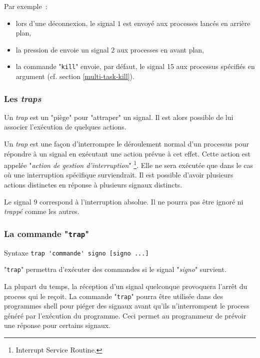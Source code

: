 Par exemple~:
\begin{itemize}
	\item	lors d'une d{\'e}connexion, le signal $1$ est envoy{\'e} aux processes lanc{\'e}s en
			arri{\`e}re plan,
	\item	la pression de  envoie un signal $2$ aux
			processes en avant plan,
	\item	la commande "\texttt{kill}" envoie, par d{\'e}faut, le signal 15 aux processus
			sp{\'e}cifi{\'e}s en argument (cf. section \ref{multi-task-kill}).
\end{itemize}

\subsubsection{Les \textsl{traps}}

Un \textsl{trap} est un "pi{\`e}ge" pour "attraper" un signal. Il est alors possible de lui
associer l'ex{\'e}cution de quelques actions.

Un \textsl{trap} est une fa\c{c}on d'interrompre le d{\'e}roulement normal d'un
processus pour r{\'e}pondre {\`a} un signal en ex{\'e}cutant une action pr{\'e}vue {\`a} cet
effet. Cette action est appel{\'e}e "\textsl{action de gestion d'interruption}"
\footnote{Interrupt Service Routine.}. Elle ne sera ex{\'e}cut{\'e}e que dans le cas o{\`u}
une interruption sp{\'e}cifique surviendrait. Il est possible d'avoir
plusieurs actions distinctes en r{\'e}ponse {\`a} plusieurs signaux distincts.

Le signal $9$ correspond {\`a} l'interruption absolue. Il ne pourra pas {\^e}tre ignor{\'e} ni
\textsl{trapp{\'e}} comme les autres.

\subsubsection{La commande "\texttt{trap}"}

\begin{definition}{Syntaxe}
\verb*=trap 'commande' signo [signo ...]=
\end{definition}

"\texttt{trap}" permettra d'ex{\'e}cuter des commandes si le signal
"\textsl{signo}" survient.

La plupart du temps, la r{\'e}ception d'un signal quelconque provoquera
l'arr{\^e}t du process qui le re\c{c}oit. La commande "\texttt{trap}" pourra
{\^e}tre utilis{\'e}e dans des programmes shell pour pi{\'e}ger des signaux avant
qu'ils n'interrompent le process g{\'e}n{\'e}r{\'e} par l'ex{\'e}cution du programme.
Ceci permet au programmeur de pr{\'e}voir une r{\'e}ponse pour certains signaux.

